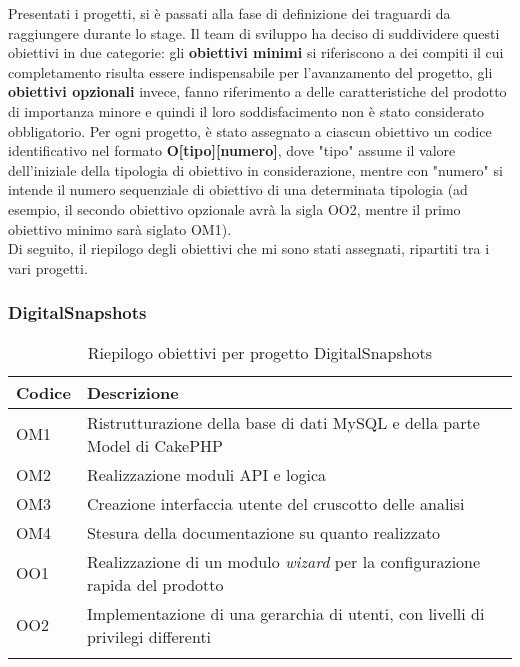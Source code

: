 Presentati i progetti, si è passati alla fase di definizione dei traguardi da raggiungere durante lo stage.
Il team di sviluppo ha deciso di suddividere questi obiettivi in due categorie: gli \textbf{obiettivi minimi} si riferiscono a dei compiti il cui completamento risulta essere indispensabile per l'avanzamento del progetto, gli \textbf{obiettivi opzionali} invece, fanno riferimento a delle caratteristiche del prodotto di importanza minore e quindi il loro soddisfacimento non è stato considerato obbligatorio.
Per ogni progetto, è stato assegnato a ciascun obiettivo un codice identificativo nel formato \textbf{O[tipo][numero]}, dove "tipo" assume il valore dell'iniziale della tipologia di obiettivo in considerazione, mentre con "numero" si intende il numero sequenziale di obiettivo di una determinata tipologia (ad esempio, il secondo obiettivo opzionale avrà la sigla OO2, mentre il primo obiettivo minimo sarà siglato OM1). \\
Di seguito, il riepilogo degli obiettivi che mi sono stati assegnati, ripartiti tra i vari progetti.

\subsubsection*{DigitalSnapshots}
\begin{center}
	\renewcommand{\arraystretch}{1.5}
	\begin{longtable}{ | p{0.1\linewidth} | p{0.9\linewidth} |}	 
		\hline   
	    \rowcolor{header}\textbf{Codice}&\textbf{Descrizione}\\
		\hline    	
    	OM1 & Ristrutturazione della base di dati MySQL e della parte Model di CakePHP \\
    	OM2 & Realizzazione moduli API e logica \\
    	OM3 & Creazione interfaccia utente del cruscotto delle analisi \\
    	OM4 & Stesura della documentazione su quanto realizzato \\
    	OO1 & Realizzazione di un modulo \textit{wizard} per la configurazione rapida del prodotto \\
    	OO2 & Implementazione di una gerarchia di utenti, con livelli di privilegi differenti \\
    	\hline
		\rowcolor{white}    	
    	\caption{Riepilogo obiettivi per progetto DigitalSnapshots}
	\end{longtable}
	\label{tab:obiettivi-digitalsnapshots}
\end{center}

